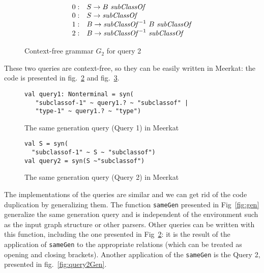 \begin{figure}[h]
   \centering
   \[
\begin{array}{rl}
   0: & S \rightarrow B \ \text{\textit{subClassOf}} \\
   0: & S \rightarrow \text{\textit{subClassOf}} \\
   1: & B \rightarrow \text{\textit{subClassOf}}^{-1} \ B \ \text{\textit{subClassOf}} \\
   2: & B \rightarrow \text{\textit{subClassOf}}^{-1} \ \text{\textit{subClassOf}} \\
\end{array}
\]
   \caption{Context-free grammar $G_2$ for query 2}
   \label{grammarQ2}
   \end{figure}

   These two queries are context-free, so they can be easily written in Meerkat: the code is presented in fig.~\ref{fig:query1Meerkat} and fig.~\ref{fig:query2Meerkat}.

\begin{figure}[h]
\begin{lstlisting}
val query1: Nonterminal = syn(
   "subclassof-1" ~ query1.? ~ "subclassof" |
   "type-1" ~ query1.? ~ "type")
\end{lstlisting}
\caption{The same generation query (Query 1) in Meerkat}
\label{fig:query1Meerkat}
\end{figure}


\begin{figure}[h]
\begin{lstlisting}
val S = syn(
  "subclassof-1" ~ S ~ "subclassof")
val query2 = syn(S ~"subclassof")
\end{lstlisting}
\caption{The same generation query (Query 2) in Meerkat}
\label{fig:query2Meerkat}
\end{figure}

The implementations of the queries are similar and we can get rid of the code duplication by generalizing them. 
The function \lstinline{sameGen} presented in Fig~\ref{fig:gen} generalize the same generation query and is independent of the environment such as the input graph structure or other parsers.
Other queries can be written with this function, including the one presented in Fig~\ref{fig:query1Meerkat}: it is the result of the application of \lstinline{sameGen} to the appropriate relations (which can be treated as opening and closing brackets).
Another application of the \lstinline{sameGen} is the Query 2, presented in fig.~\ref{fig:query2Gen}.

